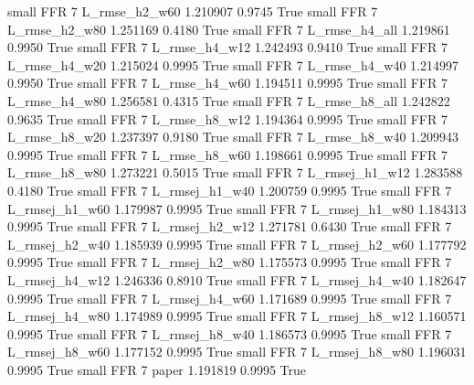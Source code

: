      small      FFR                 7  L_rmse_h2_w60   1.210907      0.9745    True
     small      FFR                 7  L_rmse_h2_w80   1.251169      0.4180    True
     small      FFR                 7  L_rmse_h4_all   1.219861      0.9950    True
     small      FFR                 7  L_rmse_h4_w12   1.242493      0.9410    True
     small      FFR                 7  L_rmse_h4_w20   1.215024      0.9995    True
     small      FFR                 7  L_rmse_h4_w40   1.214997      0.9950    True
     small      FFR                 7  L_rmse_h4_w60   1.194511      0.9995    True
     small      FFR                 7  L_rmse_h4_w80   1.256581      0.4315    True
     small      FFR                 7  L_rmse_h8_all   1.242822      0.9635    True
     small      FFR                 7  L_rmse_h8_w12   1.194364      0.9995    True
     small      FFR                 7  L_rmse_h8_w20   1.237397      0.9180    True
     small      FFR                 7  L_rmse_h8_w40   1.209943      0.9995    True
     small      FFR                 7  L_rmse_h8_w60   1.198661      0.9995    True
     small      FFR                 7  L_rmse_h8_w80   1.273221      0.5015    True
     small      FFR                 7 L_rmsej_h1_w12   1.283588      0.4180    True
     small      FFR                 7 L_rmsej_h1_w40   1.200759      0.9995    True
     small      FFR                 7 L_rmsej_h1_w60   1.179987      0.9995    True
     small      FFR                 7 L_rmsej_h1_w80   1.184313      0.9995    True
     small      FFR                 7 L_rmsej_h2_w12   1.271781      0.6430    True
     small      FFR                 7 L_rmsej_h2_w40   1.185939      0.9995    True
     small      FFR                 7 L_rmsej_h2_w60   1.177792      0.9995    True
     small      FFR                 7 L_rmsej_h2_w80   1.175573      0.9995    True
     small      FFR                 7 L_rmsej_h4_w12   1.246336      0.8910    True
     small      FFR                 7 L_rmsej_h4_w40   1.182647      0.9995    True
     small      FFR                 7 L_rmsej_h4_w60   1.171689      0.9995    True
     small      FFR                 7 L_rmsej_h4_w80   1.174989      0.9995    True
     small      FFR                 7 L_rmsej_h8_w12   1.160571      0.9995    True
     small      FFR                 7 L_rmsej_h8_w40   1.186573      0.9995    True
     small      FFR                 7 L_rmsej_h8_w60   1.177152      0.9995    True
     small      FFR                 7 L_rmsej_h8_w80   1.196031      0.9995    True
     small      FFR                 7          paper   1.191819      0.9995    True
